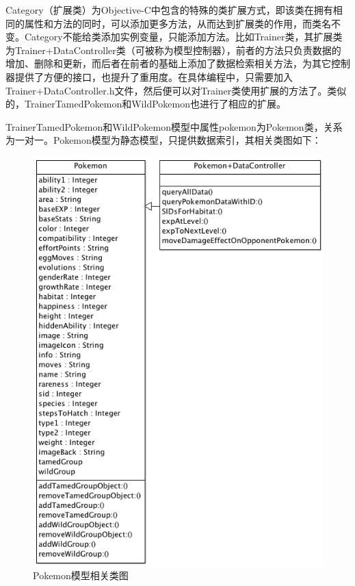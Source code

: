 \documentclass{article}
\begin{document}
\begin{CJK}{UTF8}{gbsn}
  Category（扩展类）为Objective-C中包含的特殊的类扩展方式，即该类在拥有相同的属性和方法的同时，可以添加更多方法，从而达到扩展类的作用，而类名不变。Category不能给类添加实例变量，只能添加方法\cite{B07}。比如Trainer类，其扩展类为Trainer+DataController类（可被称为模型控制器），前者的方法只负责数据的增加、删除和更新，而后者在前者的基础上添加了数据检索相关方法，为其它控制器提供了方便的接口，也提升了重用度。在具体编程中，只需要加入Trainer+DataController.h文件，然后便可以对Trainer类使用扩展的方法了。类似的，TrainerTamedPokemon和WildPokemon也进行了相应的扩展。

  TrainerTamedPokemon和WildPokemon模型中属性pokemon为Pokemon类，关系为一对一。Pokemon模型为静态模型，只提供数据索引，其相关类图如下：

  \begin{figure}[htbp]
		\centering
		\includegraphics[bb=0 0 508 715, scale=0.45]{figure/fig_n15.png}
		\caption{Pokemon模型相关类图}
		\label{fig:n15}
	\end{figure}


\end{CJK}
\end{document}

